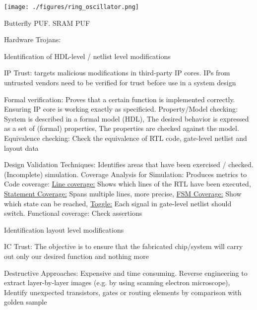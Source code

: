 \documentclass[landscape, a4paper]{article}
\begin{document}
\begin{minipage}[t]{0.2\linewidth}
\begin{betterlist}
\begin{betterlist}
\begin{betterlist}
\begin{betterlist}
\begin{betterlist}
						\texttt{[image: ./figures/ring\_oscillator.png]}
						\item \alert{Butterfly PUF}. \alert{SRAM PUF}
					\end{betterlist}
				\end{betterlist}
			\end{betterlist}
		\end{betterlist}
		\item \alert{Hardware Trojans:}
		\begin{betterlist}
			\item \alert{Identification of HDL-level / netlist level modifications}
			\begin{betterlist}
				\item \alert{IP Trust:} targets malicious modifications in third-party IP cores. IPs from untrusted vendors need to be verified for trust before use in a system design
				\item \alert{Formal verification:} Proves that a certain function is implemented correctly. Ensuring IP core is working exactly as specificied. \alert{Property/Model checking:} System is described in a formal model (HDL), The desired behavior is expressed as a set of (formal) properties, The properties are checked against the model. \alert{Equivalence checking:} Check the equivalence of RTL code, gate-level netlist and layout data
				\item \alert{Design Validation Techniques:} Identifies areas that have been exercised / checked. \alert{(Incomplete) simulation}. \alert{Coverage Analysis for Simulation:} Produces metrics to \alert{Code coverage:} \underline{Line coverage:} Shows which lines of the RTL have been executed, \underline{Statement Coverage:} Spans multiple lines, more precise, \underline{FSM Coverage:} Show which state can be reached, \underline{Toggle:} Each signal in gate-level netlist should switch. \alert{Functional coverage:} Check assertions
			\end{betterlist}
			\item \alert{Identification layout level modifications}
			\begin{betterlist}
				\item \alert{IC Trust:} The objective is to ensure that the fabricated chip/system will carry out only our desired function and nothing more
				\item \alert{Destructive Approaches:} Expensive and time consuming. Reverse engineering to extract layer-by-layer images (e.g. by using scanning electron microscope), Identify unexpected transistors, gates or routing elements by comparison with golden sample

\end{betterlist}
\end{betterlist}
\end{betterlist}
\end{minipage}
\end{document}

